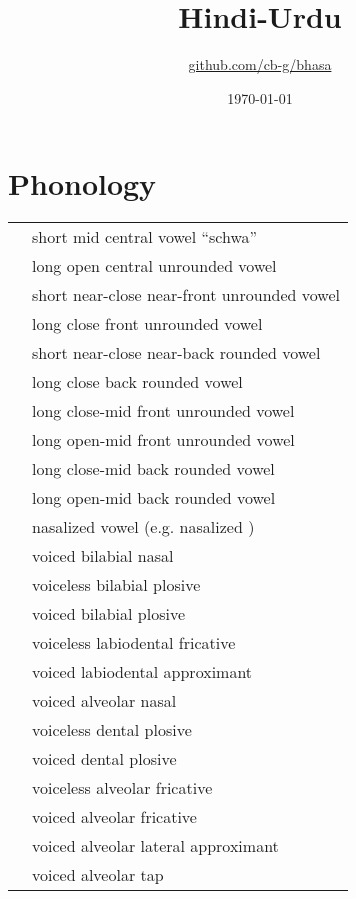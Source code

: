 \documentclass[12pt]{article}
\title{Hindi-Urdu\\\ipa{["HIndi: "URdu:]}}
\author{\href{https://github.com/cb-g/bhasa}{github.com/cb-g/bhasa}}
\date{\today}
\begin{document}
\pagecolor{custom_bg}\color{custom_fg}
\maketitle\thispagestyle{empty}

\newpage\setcounter{page}{1}\section{Phonology}

\begin{xltabular}{\textwidth}{lL}
   & short mid central vowel ``schwa'' \\
   & long open central unrounded vowel \\
   & short near-close near-front unrounded vowel \\
   & long close front unrounded vowel \\
   & short near-close near-back rounded vowel \\
   & long close back rounded vowel \\
   & long close-mid front unrounded vowel \\
   & long open-mid front unrounded vowel \\
   & long close-mid back rounded vowel \\
   & long open-mid back rounded vowel \\
   & nasalized vowel (e.g. nasalized ) \\
   & voiced bilabial nasal \\
   & voiceless bilabial plosive \\
   & voiced bilabial plosive \\
   & voiceless labiodental fricative \\
   & voiced labiodental approximant \\
   & voiced alveolar nasal \\
   & voiceless dental plosive \\
   & voiced dental plosive \\
   & voiceless alveolar fricative \\
   & voiced alveolar fricative \\
   & voiced alveolar lateral approximant \\
   & voiced alveolar tap \\

\end{xltabular}
\end{document}
